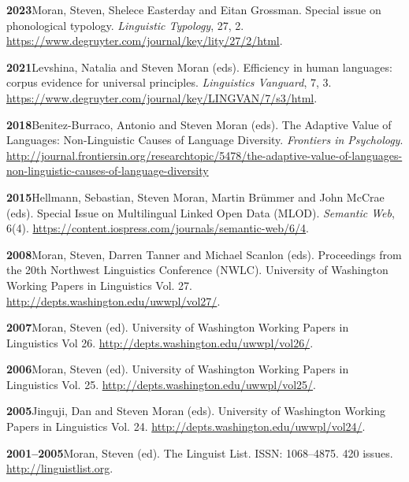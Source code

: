 \documentclass[11pt]{article}
\newcommand{\hangpara}{
 \setlength{\parindent}{0in} %
 \hangindent=0.42in %
}
\begin{document}
\hangpara
\vskip 6pt
{\bf 2023}\hspace{1ex}Moran, Steven, Shelece Easterday and Eitan Grossman. Special issue on phonological typology. {\it Linguistic Typology}, 27, 2. \url{https://www.degruyter.com/journal/key/lity/27/2/html}.

\hangpara
\vskip 6pt
{\bf 2021}\hspace{1ex}Levshina, Natalia and Steven Moran (eds). Efficiency in human languages: corpus evidence for universal principles. {\it Linguistics Vanguard}, 7, 3. \url{https://www.degruyter.com/journal/key/LINGVAN/7/s3/html}.

\hangpara
\vskip 6pt
{\bf 2018}\hspace{1ex}Benitez-Burraco, Antonio and Steven Moran (eds). The Adaptive Value of Languages: Non-Linguistic Causes of Language Diversity. {\it Frontiers in Psychology}. \url{http://journal.frontiersin.org/researchtopic/5478/the-adaptive-value-of-languages-non-linguistic-causes-of-language-diversity}

\hangpara
\vskip 6pt
{\bf 2015}\hspace{1ex}Hellmann, Sebastian, Steven Moran, Martin Brümmer and John McCrae (eds). Special Issue on Multilingual Linked Open Data (MLOD). \textit{Semantic Web}, 6(4). \url{https://content.iospress.com/journals/semantic-web/6/4}.

\vskip 6pt
\hangpara
{\bf 2008}\hspace{1ex}Moran, Steven, Darren Tanner and Michael Scanlon (eds). Proceedings from the 20th Northwest Linguistics Conference (NWLC). University of Washington Working Papers in Linguistics Vol. 27. \url{http://depts.washington.edu/uwwpl/vol27/}.

\vskip 6pt
\hangpara
{\bf 2007}\hspace{1ex}Moran, Steven (ed). University of Washington Working Papers in Linguistics Vol 26. \url{http://depts.washington.edu/uwwpl/vol26/}.

\vskip 6pt
\hangpara
{\bf 2006}\hspace{1ex}Moran, Steven (ed). University of Washington Working Papers in Linguistics Vol. 25. \url{http://depts.washington.edu/uwwpl/vol25/}.

\vskip 6pt
\hangpara
{\bf 2005}\hspace{1ex}Jinguji, Dan and Steven Moran (eds). University of Washington Working Papers in Linguistics Vol. 24. \url{http://depts.washington.edu/uwwpl/vol24/}.

\vskip 6pt
\hangpara
{\bf 2001--2005}\hspace{1ex}Moran, Steven (ed). The Linguist List. ISSN: 1068--4875. 420 issues. \url{http://linguistlist.org}.
\end{document}

